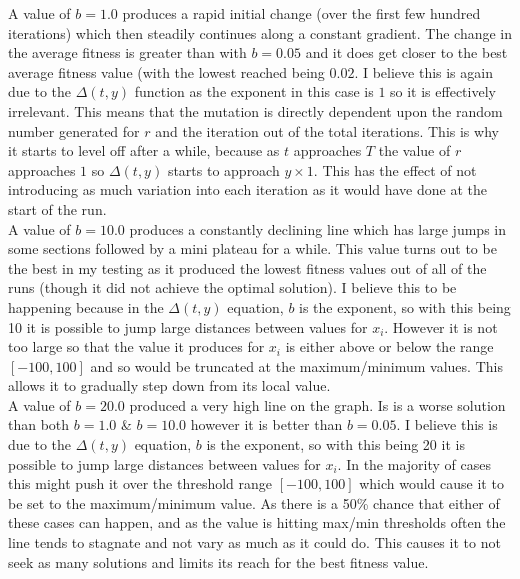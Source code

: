 \documentclass{article}
\begin{document}
	A value of $b=1.0$ produces a rapid initial change (over the first few hundred iterations) which then steadily continues along a constant gradient. The change in the average fitness is greater than with $b=0.05$ and it does get closer to the best average fitness value (with the lowest reached being $0.02$. I believe this is again due to the $\Delta(t, y)$ function as the exponent in this case is $1$ so it is effectively irrelevant. This means that the mutation is directly dependent upon the random number generated for $r$ and the iteration out of the total iterations. This is why it starts to level off after a while, because as $t$ approaches $T$ the value of $r$ approaches $1$ so $\Delta(t, y)$ starts to approach $y \times 1$. This has the effect of not introducing as much variation into each iteration as it would have done at the start of the run.\\
	
	A value of $b=10.0$ produces a constantly declining line which has large jumps in some sections followed by a mini plateau for a while. This value turns out to be the best in my testing as it produced the lowest fitness values out of all of the runs (though it did not achieve the optimal solution). I believe this to be happening because in the $\Delta(t, y)$ equation, $b$ is the exponent, so with this being 10 it is possible to jump large distances between values for $x_i$. However it is not too large so that the value it produces for $x_i$ is either above or below the range $[-100, 100]$ and so would be truncated at the maximum/minimum values. This allows it to gradually step down from its local value.\\
	
	A value of $b=20.0$ produced a very high line on the graph. Is is a worse solution than both $b=1.0$ \& $b=10.0$ however it is better than $b=0.05$. I believe this is due to the $\Delta(t, y)$ equation, $b$ is the exponent, so with this being 20 it is possible to jump large distances between values for $x_i$. In the majority of cases this might push it over the threshold range $[-100, 100]$ which would cause it to be set to the maximum/minimum value. As there is a 50\% chance that either of these cases can happen, and as the value is hitting max/min thresholds often the line tends to stagnate and not vary as much as it could do. This causes it to not seek as many solutions and limits its reach for the best fitness value.\\
	
\end{document}
